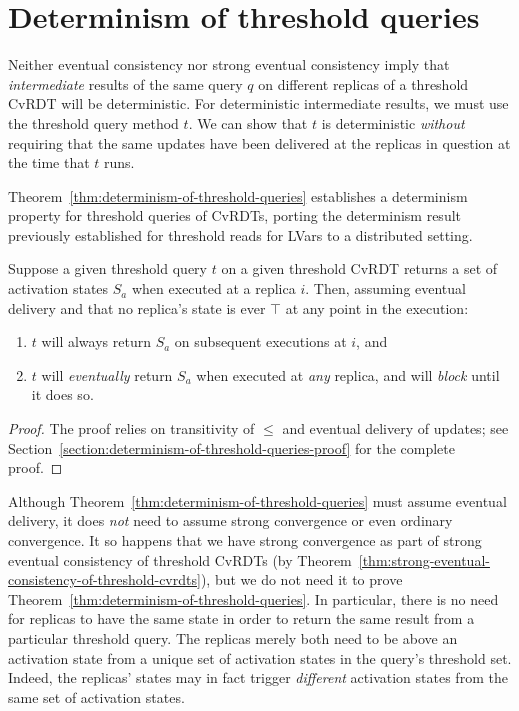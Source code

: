 \section{Determinism of threshold queries}\label{s:distributed-results}

Neither eventual consistency nor strong eventual consistency imply
that \emph{intermediate} results of the same query $q$ on different
replicas of a threshold CvRDT will be deterministic.  For
deterministic intermediate results, we must use the threshold query
method $t$.  We can show that $t$ is deterministic \emph{without}
requiring that the same updates have been delivered at the replicas in
question at the time that $t$ runs.

Theorem~\ref{thm:determinism-of-threshold-queries} establishes a
determinism property for threshold queries of CvRDTs, porting the
determinism result previously established for threshold reads for
LVars to a distributed setting.

\begin{thm}
  \label{thm:determinism-of-threshold-queries}
  Suppose a given threshold query $t$ on a given threshold CvRDT
  returns a set of activation states $S_a$ when executed at a replica
  $i$.  Then, assuming eventual delivery and that no replica's state
  is ever $\top$ at any point in the execution:
  \begin{enumerate}
  \item \label{thm:this-replica} $t$ will always return $S_a$ on
    subsequent executions at $i$, and
  \item \label{thm:any-replica} $t$ will \emph{eventually} return
    $S_a$ when executed at \emph{any} replica, and will \emph{block}
    until it does so.
  \end{enumerate}
\end{thm}
\begin{proof}
The proof relies on transitivity of $\leq$ and eventual delivery of
updates; see
Section~\ref{section:determinism-of-threshold-queries-proof} for the
complete proof.
\end{proof}

Although Theorem~\ref{thm:determinism-of-threshold-queries} must
assume eventual delivery, it does \emph{not} need to assume strong
convergence or even ordinary convergence.  It so happens that we have
strong convergence as part of strong eventual consistency of threshold
CvRDTs (by
Theorem~\ref{thm:strong-eventual-consistency-of-threshold-cvrdts}),
but we do not need it to prove
Theorem~\ref{thm:determinism-of-threshold-queries}.  In particular,
there is no need for replicas to have the same state in order to
return the same result from a particular threshold query.  The
replicas merely both need to be above an activation state from a
unique set of activation states in the query's threshold set.  Indeed,
the replicas' states may in fact trigger \emph{different} activation
states from the same set of activation states.

